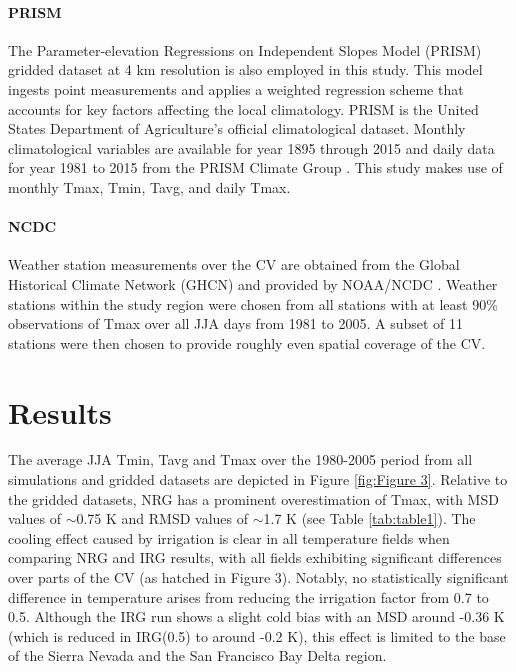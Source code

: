 \documentclass[draft,ms]{agutex}   %
\begin{document}
\begin{article}
\paragraph{PRISM} The Parameter-elevation Regressions on Independent Slopes Model (PRISM) \citep{daly2008physiographically} gridded dataset at 4 km resolution is also employed in this study.  This model ingests point measurements and applies a weighted regression scheme that accounts for key factors affecting the local climatology. PRISM is the United States Department of Agriculture's official climatological dataset. Monthly climatological variables are available for year 1895 through 2015 and daily data for year 1981 to 2015 from the PRISM Climate Group \citep{prismSource}. This study makes use of monthly Tmax, Tmin, Tavg, and daily Tmax.

\paragraph{NCDC} Weather station measurements over the CV are obtained from the Global Historical Climate Network (GHCN) and provided by NOAA/NCDC \citep{menne2012overview}. Weather stations within the study region were chosen from all stations with at least 90$\%$ observations of Tmax over all JJA days from 1981 to 2005.  A subset of 11 stations were then chosen to provide roughly even spatial coverage of the CV.

\section{Results}

The average JJA Tmin, Tavg and Tmax over the 1980-2005 period from all simulations and gridded datasets are depicted in Figure \ref{fig:Figure 3}. Relative to the gridded datasets, NRG has a prominent overestimation of Tmax, with MSD values of $\sim$0.75 K and RMSD values of $\sim$1.7 K (see Table \ref{tab:table1}). The cooling effect caused by irrigation is clear in all temperature fields when comparing NRG and IRG results, with all fields exhibiting significant differences over parts of the CV (as hatched in Figure 3). Notably, no statistically significant difference in temperature arises from reducing the irrigation factor from 0.7 to 0.5. Although the IRG run shows a slight cold bias with an MSD around -0.36 K (which is reduced in IRG(0.5) to around -0.2 K), this effect is limited to the base of the Sierra Nevada and the San Francisco Bay Delta region.


\end{article}
\end{document}
